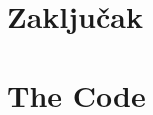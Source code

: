 \documentclass[seminarskirad]{fer}
\begin{document}
\chapter{Zaključak}
\label{pog:zakljucak}

\blindtext







\backmatter

\chapter{The Code}

\Blindtext
\end{document}
